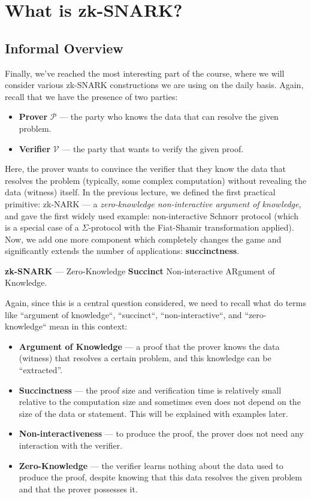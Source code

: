 \documentclass[../lecture-notes.tex]{subfiles}
\begin{document}
\section{What is zk-SNARK?}

\subsection{Informal Overview}

Finally, we've reached the most interesting part of the course, where we will consider various zk-SNARK constructions we are using on the daily basis. Again, recall that we have the presence of two parties:
\begin{itemize}
    \item \textbf{Prover} $\mathcal{P}$ --- the party who knows the data that can resolve the given problem.
    \item \textbf{Verifier} $\mathcal{V}$ --- the party that wants to verify the given proof.
\end{itemize}

Here, the prover wants to convince the verifier that they know the data that resolves the problem (typically, some complex computation) without revealing the data (witness) itself. In the previous lecture, we defined the first practical primitive: zk-NARK --- a \textit{zero-knowledge non-interactive argument of knowledge}, and gave the first widely used example: non-interactive Schnorr protocol (which is a special case of a $\Sigma$-protocol with the Fiat-Shamir transformation applied). Now, we add one more component which completely changes the game and significantly extends the number of applications: \textbf{succinctness}.

\begin{definition}
    \textbf{zk-SNARK} --- Zero-Knowledge \textbf{Succinct} Non-interactive ARgument of Knowledge.
\end{definition}

Again, since this is a central question considered, we need to recall what do terms like ``argument of knowledge``, ``succinct``, ``non-interactive``, and 
``zero-knowledge`` mean in this context:

\begin{itemize}
    \item \textbf{Argument of Knowledge} --- a proof that the prover knows the data (witness) that resolves a certain
    problem, and this knowledge can be ``extracted''.
    \item \textbf{Succinctness} --- the proof size and verification time is relatively small relative to the computation size and sometimes even does not depend on the size of 
    the data or statement. This will be explained with examples later.
    \item \textbf{Non-interactiveness} --- to produce the proof, the prover does not need any interaction
    with the verifier.
    \item \textbf{Zero-Knowledge} --- the verifier learns nothing about the data used to produce the
    proof, despite knowing that this data resolves the given problem and that the prover possesses it.
\end{itemize}
\end{document}
